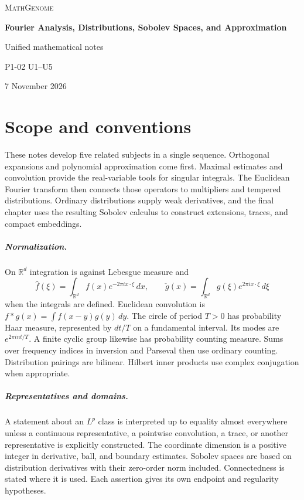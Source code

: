 \documentclass[11pt,oneside,openany]{book}
\theoremstyle{definition}
\theoremstyle{remark}
\begin{document}
\frontmatter
\hypersetup{pageanchor=false}
\begin{titlepage}
\centering
\vspace*{0.17\textheight}
{\large\scshape MathGenome\par}
\vspace{2em}
{\Huge\bfseries Fourier Analysis, Distributions, Sobolev Spaces, and Approximation\par}
\vspace{1.8em}
{\Large Unified mathematical notes\par}
\vfill
{\large P1-02 \enspace\textbullet\enspace U1--U5\par}
\vspace{0.5em}
{7 November 2026\par}
\end{titlepage}
\hypersetup{pageanchor=true}

\chapter*{Scope and conventions}
These notes develop five related subjects in a single sequence. Orthogonal expansions and polynomial approximation come first. Maximal estimates and convolution provide the real-variable tools for singular integrals. The Euclidean Fourier transform then connects those operators to multipliers and tempered distributions. Ordinary distributions supply weak derivatives, and the final chapter uses the resulting Sobolev calculus to construct extensions, traces, and compact embeddings.

\paragraph{Normalization.}
On \(\mathbb R^d\) integration is against Lebesgue measure and
\[
 \widehat f(\xi)=\int_{\mathbb R^d} f(x)e^{-2\pi i x\cdot\xi}\,dx,\qquad
 \check g(x)=\int_{\mathbb R^d}g(\xi)e^{2\pi i x\cdot\xi}\,d\xi
\]
when the integrals are defined. Euclidean convolution is \(f*g(x)=\int f(x-y)g(y)\,dy\). The circle of period \(T>0\) has probability Haar measure, represented by \(dt/T\) on a fundamental interval. Its modes are \(e^{2\pi i nt/T}\). A finite cyclic group likewise has probability counting measure. Sums over frequency indices in inversion and Parseval then use ordinary counting. Distribution pairings are bilinear. Hilbert inner products use complex conjugation when appropriate.

\paragraph{Representatives and domains.}
A statement about an \(L^p\) class is interpreted up to equality almost everywhere unless a continuous representative, a pointwise convolution, a trace, or another representative is explicitly constructed. The coordinate dimension is a positive integer in derivative, ball, and boundary estimates. Sobolev spaces are based on distribution derivatives with their zero-order norm included. Connectedness is stated where it is used. Each assertion gives its own endpoint and regularity hypotheses.
\end{document}

